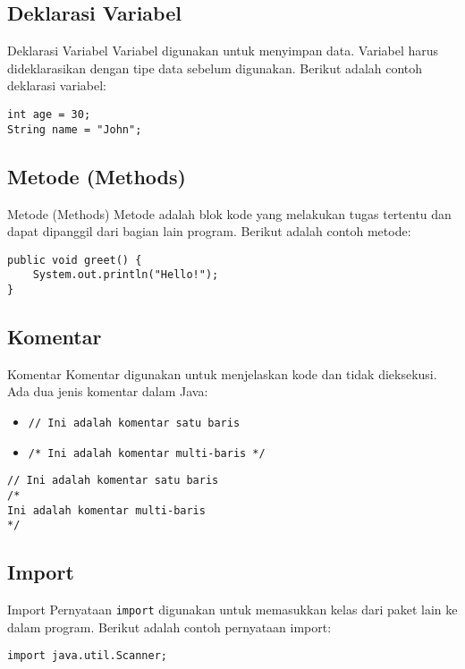 \documentclass[aspectratio=169, table]{beamer}
\begin{document}
\subsection{Deklarasi Variabel}
\begin{frame}[fragile]{Deklarasi Variabel}
Variabel digunakan untuk menyimpan data. Variabel harus dideklarasikan dengan tipe data sebelum digunakan. Berikut adalah contoh deklarasi variabel:

\begin{lstlisting}[style=JavaStyle]
int age = 30;
String name = "John";
\end{lstlisting}
\end{frame}

\subsection{Metode (Methods)}
\begin{frame}[fragile]{Metode (Methods)}
Metode adalah blok kode yang melakukan tugas tertentu dan dapat dipanggil dari bagian lain program. Berikut adalah contoh metode:

\begin{lstlisting}[style=JavaStyle]
public void greet() {
	System.out.println("Hello!");
}
\end{lstlisting}
\end{frame}

\subsection{Komentar}
\begin{frame}[fragile]{Komentar}
Komentar digunakan untuk menjelaskan kode dan tidak dieksekusi. Ada dua jenis komentar dalam Java:

\begin{itemize}
\item \texttt{// Ini adalah komentar satu baris}
\item \texttt{/* Ini adalah komentar multi-baris */}
\end{itemize}

\begin{lstlisting}[style=JavaStyle]
// Ini adalah komentar satu baris
/*
Ini adalah komentar multi-baris
*/
\end{lstlisting}
\end{frame}

\subsection{Import}
\begin{frame}[fragile]{Import}
Pernyataan \texttt{import} digunakan untuk memasukkan kelas dari paket lain ke dalam program. Berikut adalah contoh pernyataan import:

\begin{lstlisting}[style=JavaStyle]
import java.util.Scanner;
\end{lstlisting}
\end{frame}
\end{document}

